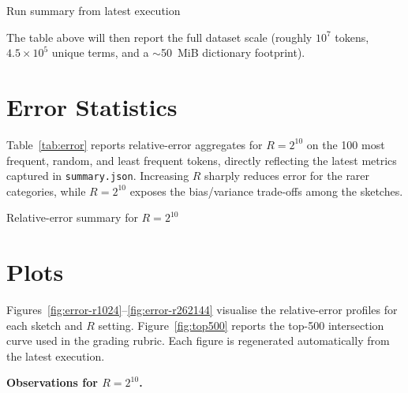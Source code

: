 \documentclass[11pt]{article}
\begin{document}
\begin{table}[H]
  \centering
  \caption{Run summary from latest execution}
  \label{tab:run-summary}
  
\end{table}
The table above will then report the full dataset scale (roughly $10^7$ tokens, $4.5\times 10^5$ unique terms, and a $\sim$50~MiB dictionary footprint).

\section{Error Statistics}
Table~\ref{tab:error} reports relative-error aggregates for $R=2^{10}$ on the 100 most frequent, random, and least frequent tokens, directly reflecting the latest metrics captured in \texttt{summary.json}. Increasing $R$ sharply reduces error for the rarer categories, while $R=2^{10}$ exposes the bias/variance trade-offs among the sketches.

\begin{table}[H]
  \centering
  
  \caption{Relative-error summary for $R=2^{10}$}
  \label{tab:error}
\end{table}

\section{Plots}
Figures~\ref{fig:error-r1024}--\ref{fig:error-r262144} visualise the relative-error profiles for each sketch and $R$ setting. Figure~\ref{fig:top500} reports the top-500 intersection curve used in the grading rubric. Each figure is regenerated automatically from the latest execution.

\noindent\textbf{Observations for $R=2^{10}$.}
\end{document}
